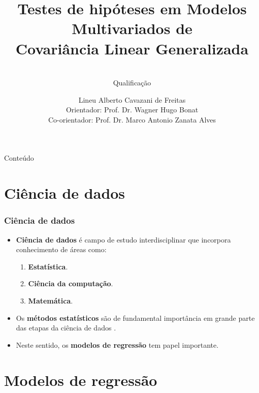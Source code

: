 \documentclass[10pt,
  aspectratio=169,
  serif,
  mathserif,
  professionalfont,
  compress,
  handout,
  ]{beamer}\usepackage[]{graphicx}\usepackage[]{color}
\title[TH MCGLM]{
  \Large Testes de hipóteses em Modelos Multivariados de \\ Covariância Linear Generalizada}
\subtitle{ \\ Qualificação}
\author[Lineu Alberto]{\small
  Lineu Alberto Cavazani de Freitas \\
  Orientador: Prof. Dr. Wagner Hugo Bonat\\
  Co-orientador: Prof. Dr. Marco Antonio Zanata Alves
}
\institute[UFPR]{
    PPG Informática %
% 
 }
\date{}
\begin{document}
\frame{\titlepage}

 \begin{frame}{Conteúdo}
   \small{\tableofcontents}
 \end{frame}





\section{Ciência de dados}


\begin{frame}
  \frametitle{Ciência de dados}
  \begin{itemize}
    \itemsep 2ex
  
  \item \textbf{Ciência de dados} é campo de estudo interdisciplinar que incorpora conhecimento de áreas como:
  
  \begin{enumerate}
    \item \textbf{Estatística}.
    \item \textbf{Ciência da computação}.
    \item \textbf{Matemática}.
  \end{enumerate}

  \item Os \textbf{métodos estatísticos} são de fundamental importância em grande parte das etapas da ciência de dados \cite{weihs2018data}.
  
  \item Neste sentido, os \textbf{modelos de regressão} tem papel importante.
  
  \end{itemize}
\end{frame}


\section{Modelos de regressão}

\end{document}
